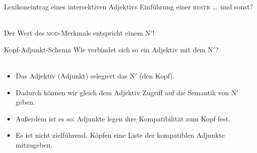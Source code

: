 \begin{frame}
  {Lexikoneintrag eines intersektiven Adjektivs}
  \onslide<+->
  \onslide<+->
  Einführung einer \textsc{restr} \ldots\ und sonst?\\
  \onslide<+->
  \Halbzeile
  \centering 
  \\
  \Halbzeile
  \raggedright
  \alert{Der Wert des \textsc{mod}-Merkmals entspricht einem N$'$!}
\end{frame}

\begin{frame}
  {Kopf-Adjunkt-Schema}
  \onslide<+->
  \onslide<+->
  Wie verbindet sich so ein Adjektiv mit dem N$'$?\\
  \onslide<+->
  \Zeile
  \centering 
   \\
  \Zeile
  \begin{itemize}[<+->]
    \item Das \alert{Adjektiv (Adjunkt) selegiert das N$'$ (den Kopf)}.
    \item Dadurch können wir gleich dem Adjektiv Zugriff auf die Semantik von N$'$ geben.
    \item Außerdem ist es so: Adjunkte legen ihre Kompatibilität zum Kopf fest.
    \item Es ist nicht zielführend, Köpfen eine Liste der kompatiblen Adjunkte mitzugeben.
  \end{itemize}
\end{frame}

